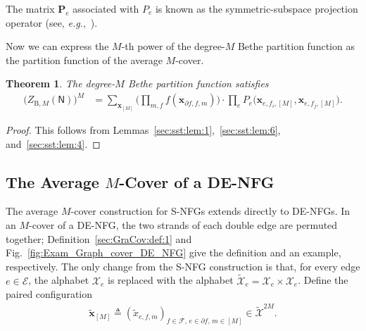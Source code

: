 \documentclass[journal]{IEEEtran}
\newcommand{\add}[1]{{\color{black}#1}}
\newtheorem{theorem}{Theorem}
\newcommand{\vect}[1]{ \bm{#1} }
\newcommand{\set}[1]{\mathcal{#1}}
\newcommand{\setEfull}{ \mathcal{E} }
\newcommand{\setF}{ \mathcal{F} }
\newcommand{\setpf}{ \partial f }
\newcommand{\vx}{ \vect{x} }
\newcommand{\graphN}{ \mathsf{N} }
\newcommand{\defeq}{ \triangleq }
\newcommand{\ZBM}{ Z_{\mathrm{B},M} }
\newcommand{\tset}[1]{\tilde{\mathcal{#1}}}
\newcommand{\matr}[1]{\vect{#1}}
\newcommand{\efi}{ e,f_i }
\newcommand{\efj}{ e,f_j }
\newcommand{\setpff}{ \partial f, f }
\newcommand{\tx}{ \tilde{x} }
\newcommand{\tvx}{ \tilde{\vect{x}}  }
\newcommand*{\eg}{\textit{e.g.}}
\begin{document}
The matrix $\matr{P}_e$ associated with $P_e$ is known as the
symmetric-subspace projection operator (see, \eg,~\cite{Harrow2013}).

Now we can express the $M$-th power of the degree-$M$ Bethe partition function as the partition function of the average $M$-cover.
\begin{theorem}
  \label{thm: expression of Z for degree M Bethe partition function}
  The degree-$M$ Bethe partition function satisfies
  \begin{align*}
    \bigl( \ZBM(\graphN) \bigr)^{\! M}
     & \!\!\!\! = \!\!
    \sum_{\vx_{[M]}}
    \!\Biggl( \prod_{m ,f} f(\vx_{\setpff,m}) \!\! \Biggr)
    \!\!\cdot \!\! \prod_{e} \! P_e\bigl( \vx_{\efi,[M]}, \vx_{\efj,[M]} \bigr).
  \end{align*}
\end{theorem}
\begin{proof}
  This follows from Lemmas~\ref{sec:sst:lem:1},~\ref{sec:sst:lem:6},
  and~\ref{sec:sst:lem:4}.
\end{proof}

\subsection{The Average \texorpdfstring{$M$}{}-Cover of a DE-NFG}
\label{sec:sst:DENFG:1}

\add{The average $M$-cover construction for S-NFGs extends directly to DE-NFGs.
  In an $M$-cover of a DE-NFG, the two strands of each double edge are permuted together; Definition~\ref{sec:GraCov:def:1} and Fig.~\ref{fig:Exam_Graph_cover_DE_NFG} give the definition and an example, respectively.
  The only change from the S-NFG construction is that, for}
every edge $e \in \setEfull$, the alphabet $\set{X}_e$ is replaced with
the alphabet $\tset{X}_e = \set{X}_e \times \set{X}_e$.
Define the paired configuration
\begin{align*}
  \tvx_{[M]} \defeq
             (\tx_{e,f,m})_{f\in\setF,\,e\in\setpf,\,m\in[M]}
  \in \tset{X}^{2M}.
\end{align*}
\end{document}
